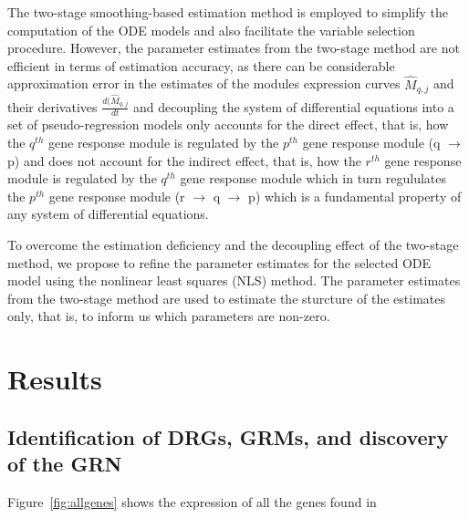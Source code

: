 The two-stage smoothing-based estimation method is employed to simplify the computation of the ODE models and also facilitate the variable selection procedure. However, the parameter estimates from the two-stage method are not efficient in terms of estimation accuracy, as there can be considerable approximation error in the estimates of the modules expression curves $\hat{M}_{q,j}$ and their derivatives $\frac{d(\hat{M}_{q,j}}{dt}$ and decoupling the system of differential equations into a set of pseudo-regression models only accounts for the direct effect, that is, how the $q^{th}$ gene response module is regulated by the $p^{th}$ gene response module (q $\rightarrow$ p) and does not account for the indirect effect, that is, how the $r^{th}$ gene response module is regulated by the $q^{th}$ gene response module which in turn regululates the $p^{th}$ gene response module (r $\rightarrow$ q $\rightarrow$ p) which is a fundamental property of any system of differential equations.

To overcome the estimation deficiency and the decoupling effect of the two-stage method, we propose to refine the parameter estimates for the selected ODE model using the nonlinear least squares (NLS) method. The parameter estimates from the two-stage method are used to estimate the sturcture of the estimates only, that is, to inform us which parameters are non-zero.

\section{Results}
\label{section:results}

\subsection{Identification of DRGs, GRMs, and discovery of the GRN}
\label{section:results1}

\par Figure~\ref{fig:allgenes} shows the expression of all the genes found in 
